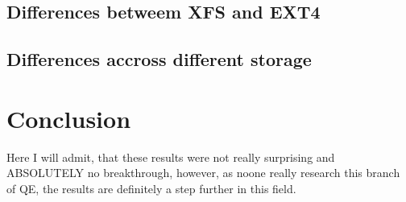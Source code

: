 \documentclass[
  color, %
  table, %
  lof,   %
  lot,   %
]{fithesis3}
\begin{document}
\section{Differences betweem XFS and EXT4}
\section{Differences accross different storage}
\chapter{Conclusion}
Here I will admit, that these results were not really surprising and ABSOLUTELY no breakthrough, however, as noone really research this branch of QE, the results are definitely a step further in this field.
\end{document}
